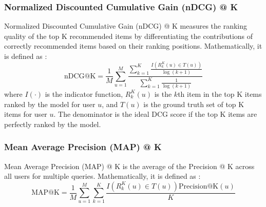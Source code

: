\documentclass{article}
\begin{document}
\subsubsection{Normalized Discounted Cumulative Gain (nDCG) @ K}

Normalized Discounted Cumulative Gain (nDCG) @ K measures the ranking quality of the top K recommended items by differentiating the contributions of correctly recommended items based on their ranking positions. Mathematically, it is defined as \cite{survey}:
$$
\mbox{nDCG@K} = \frac{1}{M} \sum_{u = 1}^M \frac{\sum_{k = 1}^K \frac{I(R^K_k(u) \in T(u))}{\log(k + 1)}}{\sum_{k = 1}^K \frac{1}{ \log(k + 1)}}
$$
where $I(\cdot)$ is the indicator function, $R^K_k(u)$ is the $k$th item in the top K items ranked by the model for user $u$, and $T(u)$ is the ground truth set of top K items for user $u$. The denominator is the ideal DCG score if the top K items are perfectly ranked by the model.

\subsubsection{Mean Average Precision (MAP) @ K}

Mean Average Precision (MAP) @ K is the average of the Precision @ K across all users for multiple queries. Mathematically, it is defined as \cite{survey}:
$$
\mbox{MAP@K} = \frac{1}{M} \sum_{u = 1}^M \sum_{k = 1}^K \frac{I(R^K_k(u) \in T(u)) \mbox{Precision@K}(u)}{K}
$$



\end{document}

